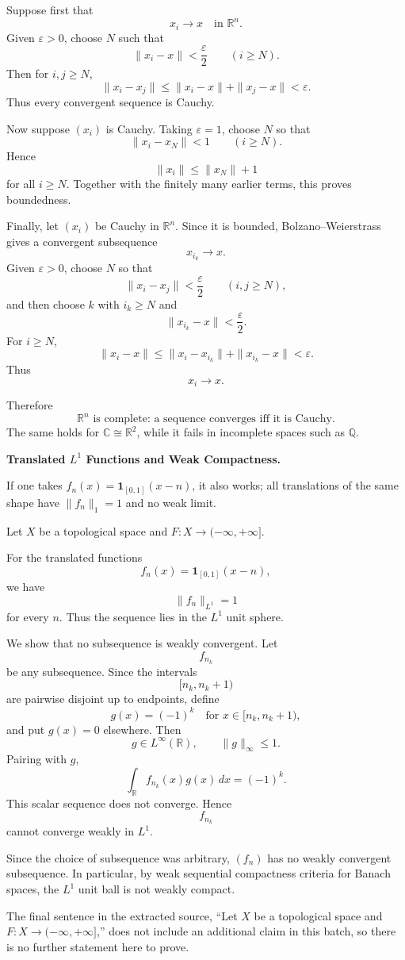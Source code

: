 \begin{solution}
Suppose first that
\[
x_i\to x
\quad\text{in }\mathbb R^n.
\]
Given \(\varepsilon>0\), choose \(N\) such that
\[
\|x_i-x\|<\frac{\varepsilon}{2}
\qquad(i\ge N).
\]
Then for \(i,j\ge N\),
\[
\|x_i-x_j\|
\le
\|x_i-x\|+\|x_j-x\|
<
\varepsilon.
\]
Thus every convergent sequence is Cauchy.

Now suppose \((x_i)\) is Cauchy. Taking \(\varepsilon=1\), choose \(N\) so that
\[
\|x_i-x_N\|<1
\qquad(i\ge N).
\]
Hence
\[
\|x_i\|
\le
\|x_N\|+1
\]
for all \(i\ge N\). Together with the finitely many earlier terms, this proves boundedness.

Finally, let \((x_i)\) be Cauchy in \(\mathbb R^n\). Since it is bounded, Bolzano--Weierstrass gives a convergent subsequence
\[
x_{i_k}\to x.
\]
Given \(\varepsilon>0\), choose \(N\) so that
\[
\|x_i-x_j\|<\frac{\varepsilon}{2}
\qquad(i,j\ge N),
\]
and then choose \(k\) with \(i_k\ge N\) and
\[
\|x_{i_k}-x\|<\frac{\varepsilon}{2}.
\]
For \(i\ge N\),
\[
\|x_i-x\|
\le
\|x_i-x_{i_k}\|
+
\|x_{i_k}-x\|
<
\varepsilon.
\]
Thus
\[
x_i\to x.
\]

Therefore
\[
\boxed{
\mathbb R^n\text{ is complete: a sequence converges iff it is Cauchy}.
}
\]
The same holds for \(\mathbb C\cong\mathbb R^2\), while it fails in incomplete spaces such as \(\mathbb Q\).
\end{solution}


\begin{problem}[CP-II-0297]
\label{prob:cp-ii-0297}
\textbf{Translated \(L^1\) Functions and Weak Compactness.}

\hspace*{1.5em}If one takes $f_n(x)=\mathbf 1_{[0,1]}(x-n)$, it also works;
		all translations of the same shape have $\|f_n\|_1=1$ and no weak limit.

	Let $X$ be a topological space and $F:X\to(-\infty,+\infty]$.
\end{problem}

\begin{solution}
For the translated functions
\[
f_n(x)
=
\mathbf1_{[0,1]}(x-n),
\]
we have
\[
\|f_n\|_{L^1}=1
\]
for every \(n\). Thus the sequence lies in the \(L^1\) unit sphere.

We show that no subsequence is weakly convergent. Let
\[
f_{n_k}
\]
be any subsequence. Since the intervals
\[
[n_k,n_k+1)
\]
are pairwise disjoint up to endpoints, define
\[
g(x)
=
(-1)^k
\quad\text{for }x\in[n_k,n_k+1),
\]
and put \(g(x)=0\) elsewhere. Then
\[
g\in L^\infty(\mathbb R),
\qquad
\|g\|_\infty\le1.
\]
Pairing with \(g\),
\[
\int_{\mathbb R}f_{n_k}(x)g(x)\,dx
=
(-1)^k.
\]
This scalar sequence does not converge. Hence
\[
f_{n_k}
\]
cannot converge weakly in \(L^1\).

Since the choice of subsequence was arbitrary, \((f_n)\) has no weakly convergent subsequence. In particular, by weak sequential compactness criteria for Banach spaces, the \(L^1\) unit ball is not weakly compact.

The final sentence in the extracted source,
``Let \(X\) be a topological space and \(F:X\to(-\infty,+\infty]\),''
does not include an additional claim in this batch, so there is no further statement here to prove.
\end{solution}


